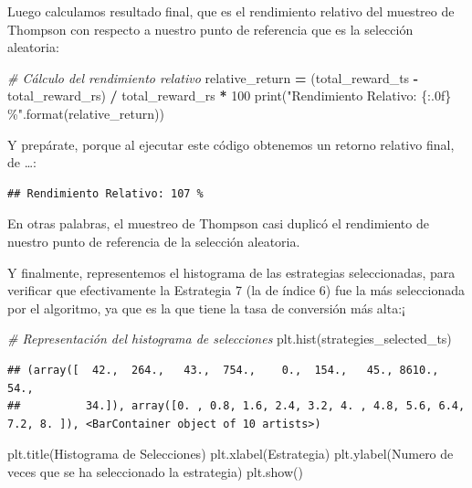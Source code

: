\documentclass[
]{book}
\newenvironment{Shaded}{\begin{snugshade}}{\end{snugshade}}
\newcommand{\BuiltInTok}[1]{#1}
\newcommand{\CommentTok}[1]{\textcolor[rgb]{0.56,0.35,0.01}{\textit{#1}}}
\newcommand{\DecValTok}[1]{\textcolor[rgb]{0.00,0.00,0.81}{#1}}
\newcommand{\NormalTok}[1]{#1}
\newcommand{\OperatorTok}[1]{\textcolor[rgb]{0.81,0.36,0.00}{\textbf{#1}}}
\newcommand{\SpecialCharTok}[1]{\textcolor[rgb]{0.00,0.00,0.00}{#1}}
\newcommand{\StringTok}[1]{\textcolor[rgb]{0.31,0.60,0.02}{#1}}
\begin{document}
Luego calculamos resultado final, que es el rendimiento relativo del muestreo de Thompson con respecto a nuestro punto de referencia que es la selección aleatoria:

\begin{Shaded}
\begin{Highlighting}[]
\CommentTok{\# Cálculo del rendimiento relativo}
\NormalTok{relative\_return }\OperatorTok{=}\NormalTok{ (total\_reward\_ts }\OperatorTok{{-}}\NormalTok{ total\_reward\_rs) }\OperatorTok{/}\NormalTok{ total\_reward\_rs }\OperatorTok{*} \DecValTok{100}
\BuiltInTok{print}\NormalTok{(}\StringTok{"Rendimiento Relativo: }\SpecialCharTok{\{:.0f\}}\StringTok{ \%"}\NormalTok{.}\BuiltInTok{format}\NormalTok{(relative\_return))}
\end{Highlighting}
\end{Shaded}

Y prepárate, porque al ejecutar este código obtenemos un retorno relativo final, de \ldots:

\begin{verbatim}
## Rendimiento Relativo: 107 %
\end{verbatim}

En otras palabras, el muestreo de Thompson casi duplicó el rendimiento de nuestro punto de referencia de la selección aleatoria.

Y finalmente, representemos el histograma de las estrategias seleccionadas, para verificar que efectivamente la Estrategia 7 (la de índice 6) fue la más seleccionada por el algoritmo, ya que es la que tiene la tasa de conversión más alta:¡

\begin{Shaded}
\begin{Highlighting}[]
\CommentTok{\# Representación del histograma de selecciones}
\NormalTok{plt.hist(strategies\_selected\_ts)}
\end{Highlighting}
\end{Shaded}

\begin{verbatim}
## (array([  42.,  264.,   43.,  754.,    0.,  154.,   45., 8610.,   54.,
##          34.]), array([0. , 0.8, 1.6, 2.4, 3.2, 4. , 4.8, 5.6, 6.4, 7.2, 8. ]), <BarContainer object of 10 artists>)
\end{verbatim}

\begin{Shaded}
\begin{Highlighting}[]
\NormalTok{plt.title(}\StringTok{\textquotesingle{}Histograma de Selecciones\textquotesingle{}}\NormalTok{)}
\NormalTok{plt.xlabel(}\StringTok{\textquotesingle{}Estrategia\textquotesingle{}}\NormalTok{)}
\NormalTok{plt.ylabel(}\StringTok{\textquotesingle{}Numero de veces que se ha seleccionado la estrategia\textquotesingle{}}\NormalTok{)}
\NormalTok{plt.show()}
\end{Highlighting}
\end{Shaded}
\end{document}
